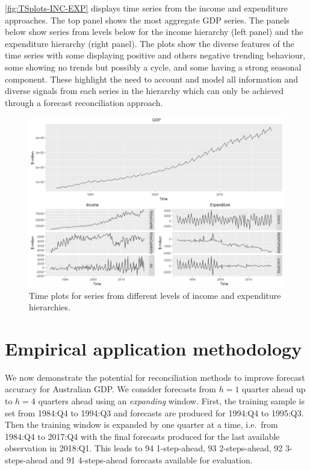 \documentclass[graybox]{svmult}
\begin{document}
\autoref{fig:TSplots-INC-EXP} displays time series from the income and expenditure approaches. The top panel shows the most aggregate GDP series. The panels below show series from levels below for the income hierarchy (left panel) and the expenditure hierarchy (right panel). The plots show the diverse features of the time series with some displaying positive and others negative trending behaviour, some showing no trends but possibly a cycle, and some having a strong seasonal component. These highlight the need to account and model all information and diverse signals from each series in the hierarchy which can only be achieved through a forecast reconciliation approach.

\begin{figure}
	\centering
	\small
	\includegraphics[width = .9\textwidth]{Figs/TS-plots/TSplots-INC-EXP.png}
	\caption{Time plots for series from different levels of income and expenditure hierarchies.}\label{fig:TSplots-INC-EXP}
\end{figure}

\section{Empirical application methodology}\label{sec:meth}

We now demonstrate the potential for reconciliation methods to improve forecast accuracy for Australian GDP\@. We consider forecasts from $h=1$ quarter ahead up to $h=4$ quarters ahead using an \emph{expanding} window. First, the training sample is set from 1984:Q4 to 1994:Q3 and forecasts are produced for 1994:Q4 to 1995:Q3. Then the training window is expanded by one quarter at a time, i.e.\ from 1984:Q4 to 2017:Q4 with the final forecasts produced for the last available observation in 2018:Q1. This leads to 94 1-step-ahead, 93 2-steps-ahead, 92 3-steps-ahead and 91 4-steps-ahead forecasts available for evaluation.
\end{document}

